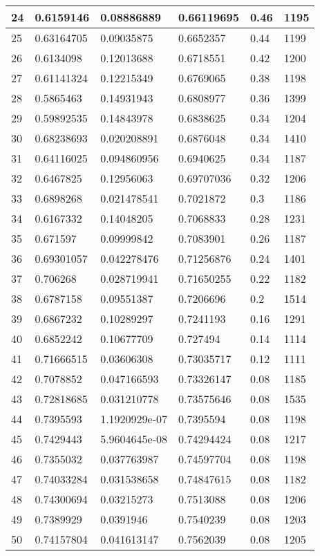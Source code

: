 \begin{longtable}{|l|l|l|l|l|l|}
24 & 0.6159146 & 0.08886889 & 0.66119695 & 0.46 & 1195 \\ \hline 
25 & 0.63164705 & 0.09035875 & 0.6652357 & 0.44 & 1199 \\ \hline 
26 & 0.6134098 & 0.12013688 & 0.6718551 & 0.42 & 1200 \\ \hline 
27 & 0.61141324 & 0.12215349 & 0.6769065 & 0.38 & 1198 \\ \hline 
28 & 0.5865463 & 0.14931943 & 0.6808977 & 0.36 & 1399 \\ \hline 
29 & 0.59892535 & 0.14843978 & 0.6838625 & 0.34 & 1204 \\ \hline 
30 & 0.68238693 & 0.020208891 & 0.6876048 & 0.34 & 1410 \\ \hline 
31 & 0.64116025 & 0.094860956 & 0.6940625 & 0.34 & 1187 \\ \hline 
32 & 0.6467825 & 0.12956063 & 0.69707036 & 0.32 & 1206 \\ \hline 
33 & 0.6898268 & 0.021478541 & 0.7021872 & 0.3 & 1186 \\ \hline 
34 & 0.6167332 & 0.14048205 & 0.7068833 & 0.28 & 1231 \\ \hline 
35 & 0.671597 & 0.09999842 & 0.7083901 & 0.26 & 1187 \\ \hline 
36 & 0.69301057 & 0.042278476 & 0.71256876 & 0.24 & 1401 \\ \hline 
37 & 0.706268 & 0.028719941 & 0.71650255 & 0.22 & 1182 \\ \hline 
38 & 0.6787158 & 0.09551387 & 0.7206696 & 0.2 & 1514 \\ \hline 
39 & 0.6867232 & 0.10289297 & 0.7241193 & 0.16 & 1291 \\ \hline 
40 & 0.6852242 & 0.10677709 & 0.727494 & 0.14 & 1114 \\ \hline 
41 & 0.71666515 & 0.03606308 & 0.73035717 & 0.12 & 1111 \\ \hline 
42 & 0.7078852 & 0.047166593 & 0.73326147 & 0.08 & 1185 \\ \hline 
43 & 0.72818685 & 0.031210778 & 0.73575646 & 0.08 & 1535 \\ \hline 
44 & 0.7395593 & 1.1920929e-07 & 0.7395594 & 0.08 & 1198 \\ \hline 
45 & 0.7429443 & 5.9604645e-08 & 0.74294424 & 0.08 & 1217 \\ \hline 
46 & 0.7355032 & 0.037763987 & 0.74597704 & 0.08 & 1198 \\ \hline 
47 & 0.74033284 & 0.031538658 & 0.74847615 & 0.08 & 1182 \\ \hline 
48 & 0.74300694 & 0.03215273 & 0.7513088 & 0.08 & 1206 \\ \hline 
49 & 0.7389929 & 0.0391946 & 0.7540239 & 0.08 & 1203 \\ \hline 
50 & 0.74157804 & 0.041613147 & 0.7562039 & 0.08 & 1205 \\ \hline 
\end{longtable}